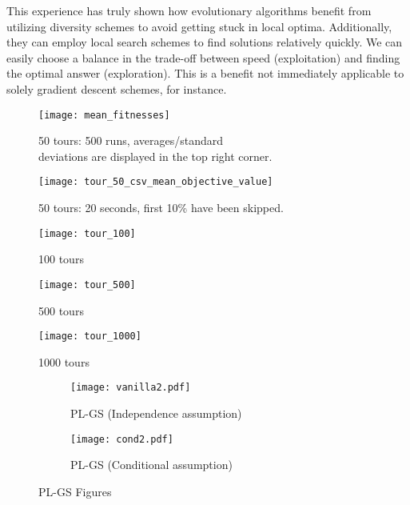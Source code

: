 \documentclass[a4paper,10pt]{article}
\begin{document}
This experience has truly shown how evolutionary algorithms benefit from utilizing diversity schemes to avoid getting stuck in local optima. Additionally, they can employ local search schemes to find solutions relatively quickly. We can easily choose a balance in the trade-off between speed (exploitation) and finding the optimal answer (exploration). This is a benefit not immediately applicable to solely gradient descent schemes, for instance.





\begin{figure}[htbp]
	\centering
	\begin{minipage}{0.5\linewidth}
		\centering
		\texttt{[image: mean\_fitnesses]}
		\caption{50 tours: 500 runs, averages/standard \\ deviations are displayed in the top right corner.}
		\label{fig:meanfitnesses}
	\end{minipage}%
	\begin{minipage}{0.5\linewidth}
		\centering
		\texttt{[image: tour\_50\_csv\_mean\_objective\_value]}
		\caption{50 tours: 20 seconds, first 10\% have been skipped.}
		\label{fig:tour50csvmeanobjectivevalue}
	\end{minipage}%
	
	\begin{minipage}{0.5\linewidth}
		\centering
		\texttt{[image: tour\_100]}
		\caption{100 tours}
		\label{fig:tour100}
	\end{minipage}%
	\begin{minipage}{0.5\linewidth}
		\centering
		\texttt{[image: tour\_500]}
		\caption{500 tours}
		\label{fig:tour500}
	\end{minipage}
	
	\begin{minipage}{0.5\linewidth}
		\centering
		\texttt{[image: tour\_1000]}
		\caption{1000 tours}
		\label{fig:tour1000}
	\end{minipage}%
\end{figure}

\begin{figure}[htbp]
	\centering
	\begin{subfigure}{0.48\linewidth}
		\texttt{[image: vanilla2.pdf]}
		\caption{PL-GS (Independence assumption)}
		\label{fig:placketluceindendent}
	\end{subfigure}
	\hfill
	\begin{subfigure}{0.48\linewidth}
		\texttt{[image: cond2.pdf]}
		\caption{PL-GS (Conditional assumption)}
		\label{fig:placketluceconditional}
	\end{subfigure}
	\caption{PL-GS Figures}
\end{figure}



\end{document}
